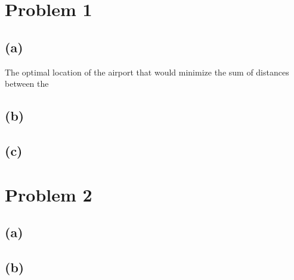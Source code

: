 \documentclass{6046}
\author{Matthew Feng}
\begin{document}
\section*{Problem 1}
\subsection*{(a)}
The optimal location of the airport that would
minimize the sum of distances between the 

\subsection*{(b)}
\subsection*{(c)}


\section*{Problem 2}
\subsection*{(a)}
\subsection*{(b)}
\end{document}
